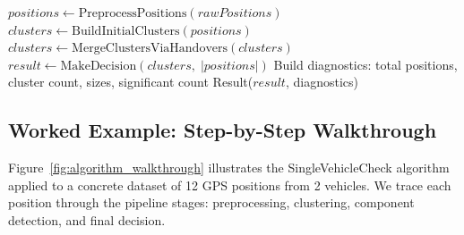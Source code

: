 \begin{algorithm}[H]
\caption{SingleVehicleCheck: Complete Pipeline}
\label{alg:complete}
\BlankLine
$\mathit{positions} \leftarrow \mathrm{PreprocessPositions}(\mathit{rawPositions})$ 
$\mathit{clusters} \leftarrow \mathrm{BuildInitialClusters}(\mathit{positions})$ 
$\mathit{clusters} \leftarrow \mathrm{MergeClustersViaHandovers}(\mathit{clusters})$ 
$\mathit{result} \leftarrow \mathrm{MakeDecision}(\mathit{clusters},\; |\mathit{positions}|)$ 
Build diagnostics: total positions, cluster count, sizes, significant count\;
\Return Result($\mathit{result}$, diagnostics)\;
\end{algorithm}
\vspace{1em}

\subsection{Worked Example: Step-by-Step Walkthrough}

Figure~\ref{fig:algorithm_walkthrough} illustrates the SingleVehicleCheck algorithm applied to a concrete dataset of 12 GPS positions from 2 vehicles. We trace each position through the pipeline stages: preprocessing, clustering, component detection, and final decision.

